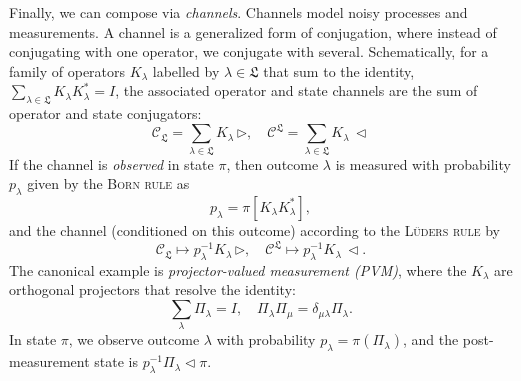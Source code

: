 Finally, we can compose via \emph{channels}.
Channels model noisy processes and measurements.
A channel is a generalized form of conjugation, where instead of
conjugating with one operator, we conjugate with
several. Schematically, for a family of operators $K_\lambda$ labelled by $\lambda
\in \mathfrak{L}$ that sum to the identity, $\sum_{\lambda\in
  \mathfrak{L}} K_\lambda K_\lambda^* = I$, the associated operator and state channels are the sum
of operator and state conjugators:
\[
  \mathcal{C}_{\mathfrak{L}} = \sum_{\lambda\in \mathfrak{L}}
  K_\lambda\, \triangleright, \quad   \mathcal{C}^{\mathfrak{L}} = \sum_{\lambda\in \mathfrak{L}}
  K_\lambda \,\triangleleft
\]
If the channel is \emph{observed} in state $\pi$, then outcome
$\lambda$ is measured with probability $p_\lambda$ given by the \textsc{Born
  rule} as
\[
  p_\lambda = \pi[K_\lambda K_\lambda^*],
\]
and the channel (conditioned on this outcome) according to the
\textsc{L\"{u}ders rule} by
\[
  \mathcal{C}_{\mathfrak{L}} \mapsto p_\lambda^{-1} K_\lambda\,
  \triangleright, \quad \mathcal{C}^{\mathfrak{L}} \mapsto
  p_\lambda^{-1} K_\lambda \,\triangleleft.
\]
The canonical example is \emph{projector-valued measurement (PVM)},
where the $K_\lambda$ are orthogonal projectors that resolve the identity:
\[
  \sum_{\lambda} \Pi_\lambda = I, \quad \Pi_\lambda \Pi_\mu = \delta_{\mu\lambda}\Pi_\lambda.
\]
In state $\pi$, we observe outcome $\lambda$ with probability
$p_\lambda = \pi(\Pi_\lambda)$, and the post-measurement state is
$p_\lambda^{-1}\Pi_\lambda \triangleleft \pi$.

